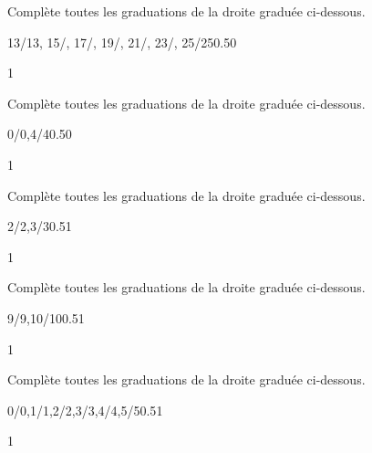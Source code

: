 \documentclass[a4paper,11pt]{report}
\begin{document}
\begin{exop}{
Complète toutes les graduations de la droite graduée ci-dessous.
\begin{center}
	\begin{numberlined}{13}{25}{2}{1}{13/13, 15/, 17/, 19/, 21/, 23/, 25/25}{0.5}{0}{}
	\end{numberlined}
\end{center}
}{1}\end{exop}

\begin{exop}{
Complète toutes les graduations de la droite graduée ci-dessous.
\begin{center}
	\begin{numberlined}{0}{4}{0.5}{0.5}{0/0,4/4}{0.5}{0}{}
	\end{numberlined}
\end{center}
}{1}\end{exop}

\begin{exop}{
Complète toutes les graduations de la droite graduée ci-dessous.
\begin{center}
	\begin{numberlined}{2}{3.5}{1}{0.1}{2/2,3/3}{0.5}{1}{}
	\end{numberlined}
\end{center}
}{1}\end{exop}

\begin{exop}{
Complète toutes les graduations de la droite graduée ci-dessous.
\begin{center}
	\begin{numberlined}{9}{10.5}{1}{0.1}{9/9,10/10}{0.5}{1}{}
	\end{numberlined}
\end{center}
}{1}\end{exop}

\begin{exop}{
Complète toutes les graduations de la droite graduée ci-dessous.
\begin{center}
	\begin{numberlined}{0}{5}{1}{0.2}{0/0,1/1,2/2,3/3,4/4,5/5}{0.5}{1}{}
	\end{numberlined}
\end{center}
}{1}\end{exop}
\end{document}
